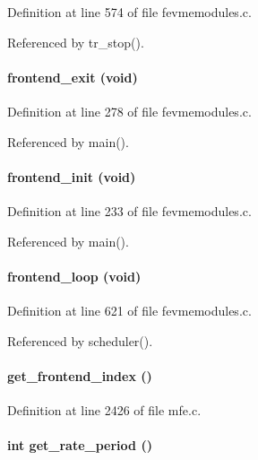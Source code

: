 Definition at line 574 of file fevmemodules.c.

Referenced by tr\_\-stop().
\paragraph[{frontend\_\-exit}]{ frontend\_\-exit (void)}\hfill\label{mfe_8c_a3b682405038cc4f6af505d7ca6367a4f}


Definition at line 278 of file fevmemodules.c.

Referenced by main().
\paragraph[{frontend\_\-init}]{ frontend\_\-init (void)}\hfill\label{mfe_8c_a802849119d469feb2d1deee1be9593ac}


Definition at line 233 of file fevmemodules.c.

Referenced by main().
\paragraph[{frontend\_\-loop}]{ frontend\_\-loop (void)}\hfill\label{mfe_8c_ad902740ed5577f2f940454359ec1df1c}


Definition at line 621 of file fevmemodules.c.

Referenced by scheduler().
\paragraph[{get\_\-frontend\_\-index}]{ get\_\-frontend\_\-index ()}\hfill\label{mfe_8c_a02d6ae60ddcaddd96c2b7b298eff077e}


Definition at line 2426 of file mfe.c.
\paragraph[{get\_\-rate\_\-period}]{\setlength{\rightskip}{0pt plus 5cm}int get\_\-rate\_\-period ()}\hfill\label{mfe_8c_a440b07315fbe46315b56aa8c954952e6}


